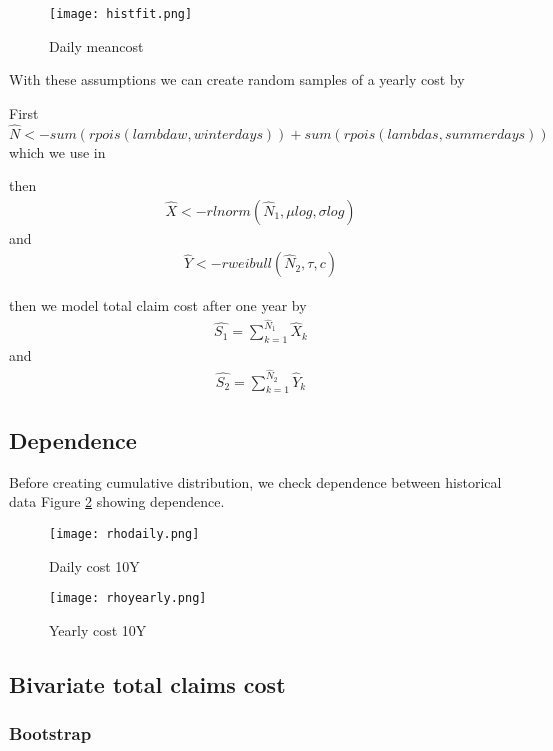 \documentclass[11pt]{article}
\begin{document}
 \begin{figure}[H]
 \center
  \texttt{[image: histfit.png]}
  \caption{Daily meancost}
  \label{fig:samplefig3}
\end{figure}

With these assumptions we can 
 create random samples of a yearly cost by

First $\hat{N} <-  sum(rpois(lambdaw,winterdays)) +  sum(rpois(lambdas,summerdays))$
which we use in

then
\begin{align*} 
	\hat{X} <- rlnorm(\hat{N}_1,\mu log,\sigma log) 
\end{align*}
and
\begin{align*} 
	 \hat{Y} <- rweibull(\hat{N}_2,\tau,c)
\end{align*}


then we model total claim cost after one year by
\begin{align} \label{eq:sum1}
	\hat{S_1} = \sum_{k=1}^{\hat{N}_1} \hat{ X}_k   
\end{align}
and
\begin{align} \label{eq:sum2}
	 \hat{S_2} = \sum_{k=1}^{\hat{N}_2} \hat{Y}_k
\end{align}


\subsection*{Dependence}
Before creating cumulative distribution, we check dependence between historical data
 Figure \ref{fig:samplefig4} showing dependence.


 \begin{figure}[H]
 \center
  \texttt{[image: rhodaily.png]}
  \caption{Daily cost 10Y}
  \label{fig:samplefig4}
\end{figure}

 \begin{figure}[H]
 \center
  \texttt{[image: rhoyearly.png]}
  \caption{Yearly cost 10Y}
  \label{fig:samplefig10y}
\end{figure}



\subsection*{Bivariate total claims cost}

\subsubsection*{Bootstrap}
\end{document}
